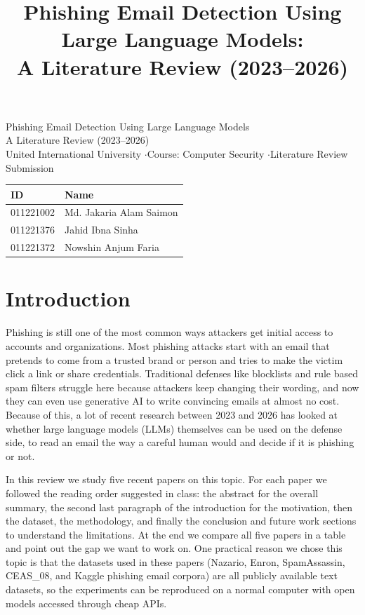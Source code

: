 \documentclass[10pt,a4paper]{article}
\title{Phishing Email Detection Using Large Language Models:\\ A Literature Review (2023--2026)}
\author{}
\date{}
\begin{document}
\begin{center}
{\Large Phishing Email Detection Using Large Language Models}\\[3pt]
{\large A Literature Review (2023--2026)}\\[8pt]
United International University \quad$\cdot$\quad Course: Computer Security \quad$\cdot$\quad Literature Review Submission\\[8pt]
\begin{tabular}{ll}
\textbf{ID} & \textbf{Name}\\
\hline
011221002 & Md. Jakaria Alam Saimon\\
011221376 & Jahid Ibna Sinha\\
011221372 & Nowshin Anjum Faria\\
\end{tabular}
\end{center}

\vspace{10pt}

\section{Introduction}

Phishing is still one of the most common ways attackers get initial access to accounts and organizations. Most phishing attacks start with an email that pretends to come from a trusted brand or person and tries to make the victim click a link or share credentials. Traditional defenses like blocklists and rule based spam filters struggle here because attackers keep changing their wording, and now they can even use generative AI to write convincing emails at almost no cost. Because of this, a lot of recent research between 2023 and 2026 has looked at whether large language models (LLMs) themselves can be used on the defense side, to read an email the way a careful human would and decide if it is phishing or not.

In this review we study five recent papers on this topic. For each paper we followed the reading order suggested in class: the abstract for the overall summary, the second last paragraph of the introduction for the motivation, then the dataset, the methodology, and finally the conclusion and future work sections to understand the limitations. At the end we compare all five papers in a table and point out the gap we want to work on. One practical reason we chose this topic is that the datasets used in these papers (Nazario, Enron, SpamAssassin, CEAS\_08, and Kaggle phishing email corpora) are all publicly available text datasets, so the experiments can be reproduced on a normal computer with open models accessed through cheap APIs.
\end{document}
